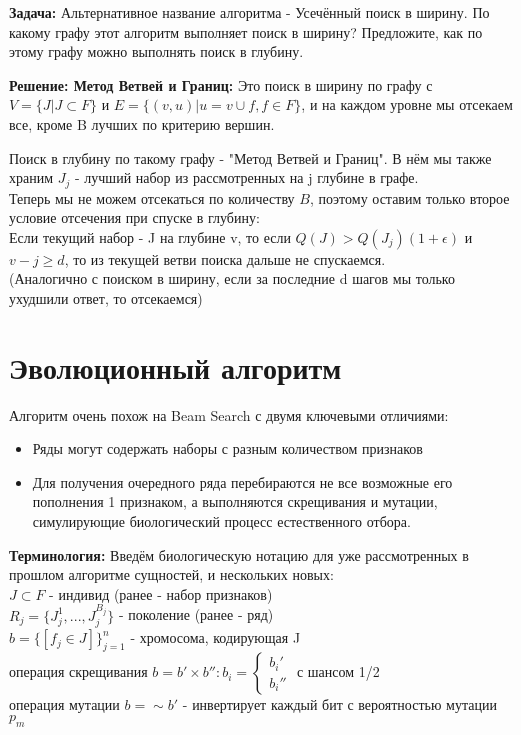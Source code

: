 \textbf{Задача:} Альтернативное название алгоритма - Усечённый поиск в ширину. По какому графу этот алгоритм выполняет поиск в ширину? Предложите, как по этому графу можно выполнять поиск в глубину.

\textbf{Решение: Метод Ветвей и Границ:} Это поиск в ширину по графу с $V=\{J| J \subset F\}$ и $E=\{(v,u)|u=v \cup f, f \in F\}$, и на каждом уровне мы отсекаем все, кроме B лучших по критерию вершин.

Поиск в глубину по такому графу - "Метод Ветвей и Границ". В нём мы также храним $J_j$ - лучший набор из рассмотренных на j глубине в графе.\\ 
Теперь мы не можем отсекаться по количеству $B$, поэтому оставим только второе условие отсечения при спуске в глубину:\\
Если текущий набор - J на глубине v, то если $Q(J)>Q(J_j) (1+\epsilon)$ и $v-j \geq d$, то из текущей ветви поиска дальше не спускаемся.\\
(Аналогично с поиском в ширину, если за последние d шагов мы только ухудшили ответ, то отсекаемся)

\section{Эволюционный алгоритм}

Алгоритм очень похож на Beam Search с двумя ключевыми отличиями:
\begin{itemize}
\item Ряды могут содержать наборы с разным количеством признаков  
\item Для получения очередного ряда перебираются не все возможные его пополнения 1 признаком, а выполняются скрещивания и мутации, симулирующие биологический процесс естественного отбора.
\end{itemize}

\textbf{Терминология:} Введём биологическую нотацию для уже рассмотренных в прошлом алгоритме сущностей, и нескольких новых: \\
$J \subset F$ - индивид (ранее - набор признаков)\\ $R_j = \{ J_j^{1}, ..., J_j^{B_j}\}$ - поколение (ранее - ряд)\\ $b = \{[f_j \in J]\}_{j=1}^n$ - хромосома, кодирующая J\\
операция скрещивания $b=b' \times b'': b_i=\begin{cases} b_i' \\ b_i'' \end{cases}$ с шансом 1/2\\
операция мутации $b=\sim b'$ - инвертирует каждый бит с вероятностью мутации $p_m$

